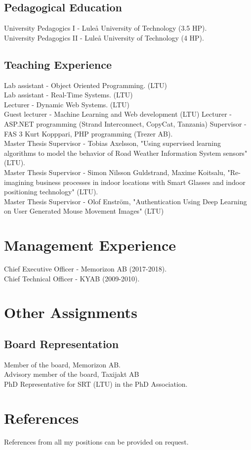 \documentclass{article}
\begin{document}
\subsection{Pedagogical Education}
University Pedagogics I - Luleå University of Technology (3.5 HP).\\
University Pedagogics II - Luleå University of Technology (4 HP).

\subsection{Teaching Experience}
Lab assistant - Object Oriented Programming. (LTU) \\
Lab assistant - Real-Time Systems. (LTU) \\
\newline
Lecturer - Dynamic Web Systems. (LTU) \\
Guest lecturer - Machine Learning and Web development (LTU)
Lecturer - ASP.NET programming (Strand Interconnect, CopyCat, Tanzania)
\newline
\newline
Supervisor - FAS 3 Kurt Kopppari, PHP programming (Trezer AB).\\
Master Thesis Supervisor - Tobias Axelsson, "Using supervised learning algorithms to model the behavior of Road Weather Information System sensors" (LTU). \\
\newline
Master Thesis Supervisor - Simon Nilsson Guldstrand, Maxime Koitsalu, "Re-imagining business processes in indoor locations with Smart Glasses and indoor positioning technology" (LTU). \\
Master Thesis Supervisor - Olof Enström, "Authentication Using Deep Learning on
User Generated Mouse Movement Images" (LTU)

\section{Management Experience}
Chief Executive Officer - Memorizon AB (2017-2018).\\
Chief Technical Officer - KYAB (2009-2010).

\section{Other Assignments}
\subsection{Board Representation}
Member of the board, Memorizon AB. \\
Advisory member of the board, Taxijakt AB\\
PhD Representative for SRT (LTU) in the PhD Association.

\section{References}
References from all my positions can be provided on request.
\end{document}
